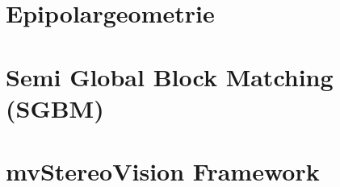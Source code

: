 \section{Epipolargeometrie}
\label{sec:epipolargeometrie}

\section{Semi Global Block Matching (SGBM)}
\label{sec:related_balloon_selection}

\section{mvStereoVision Framework}
\label{sec:framework}
